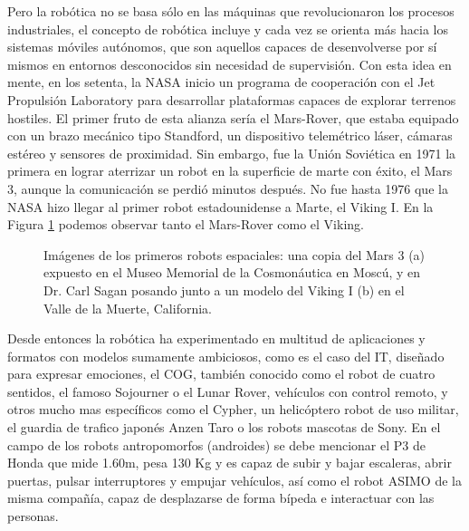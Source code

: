 Pero la robótica no se basa sólo en las máquinas que revolucionaron los procesos industriales, el concepto de robótica incluye y cada vez se orienta más hacia los sistemas móviles autónomos, que son aquellos capaces de desenvolverse por sí mismos en entornos desconocidos sin necesidad de supervisión. Con esta idea en mente, en los setenta, la NASA inicio un programa de cooperación con el Jet Propulsión Laboratory para desarrollar plataformas capaces de explorar terrenos hostiles. El primer fruto de esta alianza sería el Mars-Rover, que estaba equipado con un brazo mecánico tipo Standford, un dispositivo telemétrico láser, cámaras estéreo y sensores de proximidad. Sin embargo, fue la Unión Soviética en 1971 la primera en lograr aterrizar un robot en la superficie de marte con éxito, el Mars 3, aunque la comunicación se perdió minutos después. No fue hasta 1976 que la NASA hizo llegar al primer robot estadounidense a Marte, el Viking I. En la Figura \ref{fig:vikingmars} podemos observar tanto el Mars-Rover como el Viking.

\begin{figure}[t]
	\centering
	\hspace{0.05\textwidth}
	\caption[Los primeros robots espaciales, el Mars 3 y el Viking I.]{Imágenes de los primeros robots espaciales: una copia del Mars 3 (a) expuesto en el Museo Memorial de la Cosmonáutica en Moscú, y en Dr. Carl Sagan posando junto a un modelo del Viking I (b) en el Valle de la Muerte, California.} \label{fig:vikingmars}
\end{figure}

Desde entonces la robótica ha experimentado en multitud de aplicaciones y formatos con modelos sumamente ambiciosos, como es el caso del IT, diseñado para expresar emociones, el COG, también conocido como el robot de cuatro sentidos, el famoso Sojourner o el Lunar Rover, vehículos con control remoto, y otros mucho mas específicos como el Cypher, un helicóptero robot de uso militar, el guardia de trafico japonés Anzen Taro o los robots mascotas de Sony. En el campo de los robots antropomorfos (androides) se debe mencionar el P3 de Honda que mide 1.60m, pesa 130 Kg y es capaz de subir y bajar escaleras, abrir puertas, pulsar interruptores y empujar vehículos, así como el robot ASIMO de la misma compañía, capaz de desplazarse de forma bípeda e interactuar con las personas.

